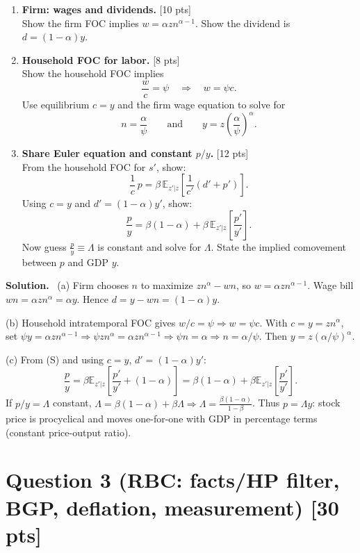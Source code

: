 \documentclass[12pt]{article}
\newenvironment{sol}{\par\smallskip\noindent\textbf{Solution.}\ }{\par\medskip}
\newcommand{\pts}[1]{\hfill{\small[#1 pts]}}
\newcommand{\E}{\mathbb{E}}
\begin{document}
\begin{enumerate}[label=(\alph*)]
\item \textbf{Firm: wages and dividends.} \pts{10}\\
Show the firm FOC implies \(w=\alpha z n^{\alpha-1}\).
Show the dividend is \(d=(1-\alpha)y\).

\item \textbf{Household FOC for labor.} \pts{8}\\
Show the household FOC implies
\[
\frac{w}{c}=\psi \quad\Rightarrow\quad w=\psi c.
\tag{L}
\]
Use equilibrium \(c=y\) and the firm wage equation to solve for
\[
n=\frac{\alpha}{\psi}
\qquad\text{and}\qquad
y=z\left(\frac{\alpha}{\psi}\right)^{\alpha}.
\]

\item \textbf{Share Euler equation and constant \(p/y\).} \pts{12}\\
From the household FOC for \(s'\), show:
\[
\frac{1}{c}\,p
=
\beta\,\E_{z'|z}\!\left[\frac{1}{c'}(d'+p')\right].
\tag{S}
\]
Using \(c=y\) and \(d'=(1-\alpha)y'\), show:
\[
\frac{p}{y}
=
\beta(1-\alpha)+\beta\,\E_{z'|z}\!\left[\frac{p'}{y'}\right].
\]
Now guess \(\frac{p}{y}\equiv \Lambda\) is constant and solve for \(\Lambda\).
State the implied comovement between \(p\) and GDP \(y\).
\end{enumerate}

\begin{sol}
(a) Firm chooses \(n\) to maximize \(zn^\alpha-wn\), so \(w=\alpha zn^{\alpha-1}\).
Wage bill \(wn=\alpha zn^\alpha=\alpha y\). Hence \(d=y-wn=(1-\alpha)y\).

(b) Household intratemporal FOC gives \(w/c=\psi\Rightarrow w=\psi c\).
With \(c=y=zn^\alpha\), set \(\psi y=\alpha zn^{\alpha-1}\Rightarrow \psi zn^\alpha=\alpha zn^{\alpha-1}\Rightarrow \psi n=\alpha\Rightarrow n=\alpha/\psi\).
Then \(y=z(\alpha/\psi)^\alpha\).

(c) From (S) and using \(c=y\), \(d'=(1-\alpha)y'\):
\[
\frac{p}{y}=\beta\E_{z'|z}\left[\frac{p'}{y'}+(1-\alpha)\right]
=\beta(1-\alpha)+\beta\E_{z'|z}\left[\frac{p'}{y'}\right].
\]
If \(p/y=\Lambda\) constant, \(\Lambda=\beta(1-\alpha)+\beta\Lambda\Rightarrow \Lambda=\frac{\beta(1-\alpha)}{1-\beta}\).
Thus \(p=\Lambda y\): stock price is procyclical and moves one-for-one with GDP in percentage terms (constant price-output ratio).
\end{sol}

\section*{Question 3 (RBC: facts/HP filter, BGP, deflation, measurement) \pts{30}}
\end{document}
